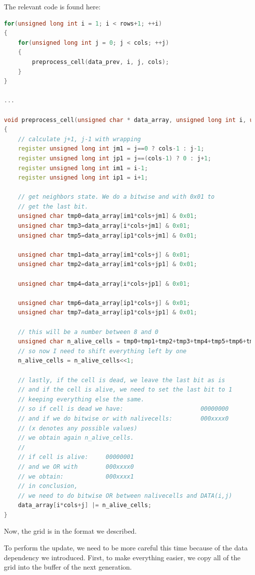 \documentclass{report}
\begin{document}
The relevant code is found here:
\begin{lstlisting}[language=C++]
for(unsigned long int i = 1; i < rows+1; ++i)
{
    for(unsigned long int j = 0; j < cols; ++j)
    {
        preprocess_cell(data_prev, i, j, cols);
    }
}

...
 
void preprocess_cell(unsigned char * data_array, unsigned long int i, unsigned long int j, unsigned long int cols)
{
    // calculate j+1, j-1 with wrapping
    register unsigned long int jm1 = j==0 ? cols-1 : j-1;
    register unsigned long int jp1 = j==(cols-1) ? 0 : j+1;
    register unsigned long int im1 = i-1;
    register unsigned long int ip1 = i+1;

    // get neighbors state. We do a bitwise and with 0x01 to  
    // get the last bit.
    unsigned char tmp0=data_array[im1*cols+jm1] & 0x01;
    unsigned char tmp3=data_array[i*cols+jm1] & 0x01;
    unsigned char tmp5=data_array[ip1*cols+jm1] & 0x01;

    unsigned char tmp1=data_array[im1*cols+j] & 0x01;
    unsigned char tmp2=data_array[im1*cols+jp1] & 0x01;

    unsigned char tmp4=data_array[i*cols+jp1] & 0x01;

    unsigned char tmp6=data_array[ip1*cols+j] & 0x01;
    unsigned char tmp7=data_array[ip1*cols+jp1] & 0x01;

    // this will be a number between 8 and 0
    unsigned char n_alive_cells = tmp0+tmp1+tmp2+tmp3+tmp4+tmp5+tmp6+tmp7;
    // so now I need to shift everything left by one
    n_alive_cells = n_alive_cells<<1;

    // lastly, if the cell is dead, we leave the last bit as is 
    // and if the cell is alive, we need to set the last bit to 1
    // keeping everything else the same. 
    // so if cell is dead we have:                      00000000
    // and if we do bitwise or with nalivecells:        000xxxx0 
    // (x denotes any possible values)
    // we obtain again n_alive_cells. 
    //
    // if cell is alive:     00000001
    // and we OR with        000xxxx0
    // we obtain:            000xxxx1
    // in conclusion,
    // we need to do bitwise OR between nalivecells and DATA(i,j)
    data_array[i*cols+j] |= n_alive_cells;
}
\end{lstlisting}

Now, the grid is in the format we described.

To perform the update, we need to be more careful this time because of the 
data dependency we introduced. First, to make everything easier, we copy 
all of the grid into the buffer of the next generation. 
\end{document}
